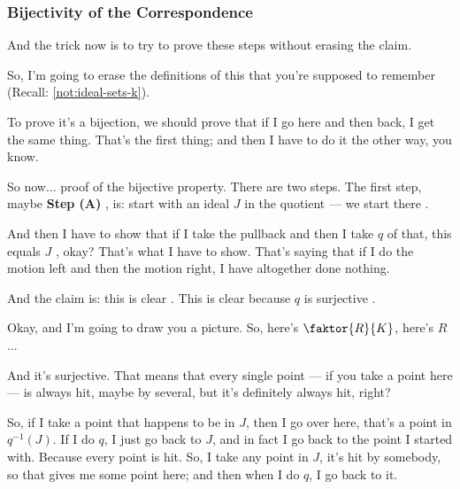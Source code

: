 \begin{proofWrapper}
\subsubsection{Bijectivity of the Correspondence}

\begin{speech}[00:28:35 - 00:30:18]
And the trick now is to try to prove these steps without erasing the claim.

So, I'm going to erase the definitions of this that you're supposed to remember (Recall: \cref{not:ideal-sets-k}). 

To prove it's a bijection, we should prove that if I go here and then back, I get the same thing. That's the first thing; and then I have to do it the other way, you know.

So now...  proof of the bijective property. There are two steps. The first step, maybe \textbf{Step (A)} , is: start with an ideal $J$ in the quotient --- we start there .

And then I have to show that if I take the pullback and then I take $q$ of that, this equals $J$ , okay? That's what I have to show. That's saying that if I do the motion left and then the motion right, I have altogether done nothing.

And the claim is: this is clear . This is clear because $q$ is surjective .

Okay, and I'm going to draw you a picture. So, here's $\faktor{R}{K}$, here's $R$...
\end{speech}

\begin{speech}[00:30:18 - 00:31:26]
And it's surjective. That means that every single point --- if you take a point here --- is always hit, maybe by several, but it's definitely always hit, right?

So, if I take a point that happens to be in $J$, then I go over here, that's a point in $q^{-1}(J)$. If I do $q$, I just go back to $J$, and in fact I go back to the point I started with. Because every point is hit. So, I take any point in $J$, it's hit by somebody, so that gives me some point here; and then when I do $q$, I go back to it.


\end{speech}
\end{proofWrapper}
